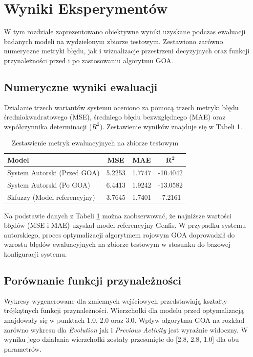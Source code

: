 \documentclass[12pt, a4paper]{article}
\begin{document}
\section{Wyniki Eksperymentów}

W tym rozdziale zaprezentowano obiektywne wyniki uzyskane podczas ewaluacji badanych modeli na wydzielonym zbiorze testowym. Zestawiono zarówno numeryczne metryki błędu, jak i wizualizacje przestrzeni decyzyjnych oraz funkcji przynależności przed i po zastosowaniu algorytmu GOA.

\subsection{Numeryczne wyniki ewaluacji}
Działanie trzech wariantów systemu oceniono za pomocą trzech metryk: błędu średniokwadratowego (MSE), średniego błędu bezwzględnego (MAE) oraz współczynnika determinacji ($R^2$). Zestawienie wyników znajduje się w Tabeli \ref{tab:wyniki_metryk}.

\begin{table}[H]
    \centering
    \caption{Zestawienie metryk ewaluacyjnych na zbiorze testowym}
    \label{tab:wyniki_metryk}
    \begin{tabular}{|l|c|c|c|}
        \hline
        \textbf{Model} & \textbf{MSE} & \textbf{MAE} & \textbf{$\mathbf{R^2}$} \\
        \hline
        System Autorski (Przed GOA) & 5.2253 & 1.7747 & -10.4042 \\
        System Autorski (Po GOA) & 6.4413 & 1.9242 & -13.0582 \\
        Skfuzzy (Model referencyjny) & 3.7645 & 1.7401 & -7.2161 \\
        \hline
    \end{tabular}
\end{table}

Na podstawie danych z Tabeli \ref{tab:wyniki_metryk} można zaobserwować, że najniższe wartości błędów (MSE i MAE) uzyskał model referencyjny Genfis. W przypadku systemu autorskiego, proces optymalizacji algorytmem rojowym GOA doprowadził do wzrostu błędów ewaluacyjnych na zbiorze testowym w stosunku do bazowej konfiguracji systemu.

\subsection{Porównanie funkcji przynależności}
Wykresy wygenerowane dla zmiennych wejściowych przedstawiają kształty trójkątnych funkcji przynależności. 
Wierzchołki dla modelu przed optymalizacją znajdowały się w punktach 1.0, 2.0 oraz 3.0. 
Wpływ algorytmu GOA na rozkład zarówno wykresu dla \textit{Evolution} jak i \textit{Previous Activity} jest wyraźnie widoczny.
W wyniku jego działania wierzchołki zostały przesunięte do [2.8, 2.8, 1.0] dla obu parametrów. 
\end{document}
